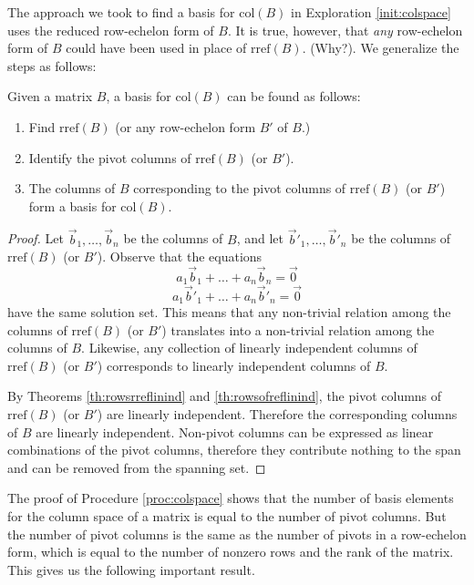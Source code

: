 \documentclass{ximera}
\begin{document}
The approach we took to find a basis for $\mbox{col}(B)$ in Exploration \ref{init:colspace} uses the reduced row-echelon form of $B$. It is true, however, that {\it any} row-echelon form of $B$ could have been used in place of $\mbox{rref}(B)$.  (Why?). We generalize the steps as follows:

\begin{procedure}\label{proc:colspace}
Given a matrix $B$, a basis for $\mbox{col}(B)$ can be found as follows:
\begin{enumerate}
\item Find $\mbox{rref}(B)$ (or any row-echelon form $B'$ of $B$.)
\item Identify the pivot columns of $\mbox{rref}(B)$ (or $B'$).
\item The columns of $B$ corresponding to the pivot columns of $\mbox{rref}(B)$ (or $B'$) form a basis for $\mbox{col}(B)$.
\end{enumerate}
\end{procedure}
\begin{proof}  Let $\vec{b}_1,\ldots ,\vec{b}_n$ be the columns of $B$, and let $\vec{b}'_1,\ldots ,\vec{b}'_n$ be the columns of $\mbox{rref}(B)$ (or $B'$).
Observe that the equations
\begin{equation}a_1\vec{b}_1+\ldots +a_n\vec{b}_n=\vec{0}\end{equation}
\begin{equation}a_1\vec{b}'_1+\ldots +a_n\vec{b}'_n=\vec{0}\end{equation}
have the same solution set.  This means that any non-trivial relation among the columns of $\mbox{rref}(B)$ (or $B'$) translates into a non-trivial relation among the columns of $B$.  Likewise, any collection of linearly independent columns of $\mbox{rref}(B)$ (or $B'$) corresponds to linearly independent columns of $B$.

By Theorems \ref{th:rowsrreflinind} and \ref{th:rowsofreflinind}, the pivot columns of $\mbox{rref}(B)$ (or $B'$) are linearly independent.  Therefore the corresponding columns of $B$ are linearly independent.  Non-pivot columns can be expressed as linear combinations of the pivot columns, therefore they contribute nothing to the span and can be removed from the spanning set. 
\end{proof}
The proof of Procedure \ref{proc:colspace} shows that the number of basis elements for the column space of a matrix is equal to the number of pivot columns.  But the number of pivot columns is the same as the number of pivots in a row-echelon form, which is equal to the number of nonzero rows and the rank of the matrix.  This gives us the following important result.
\end{document}
